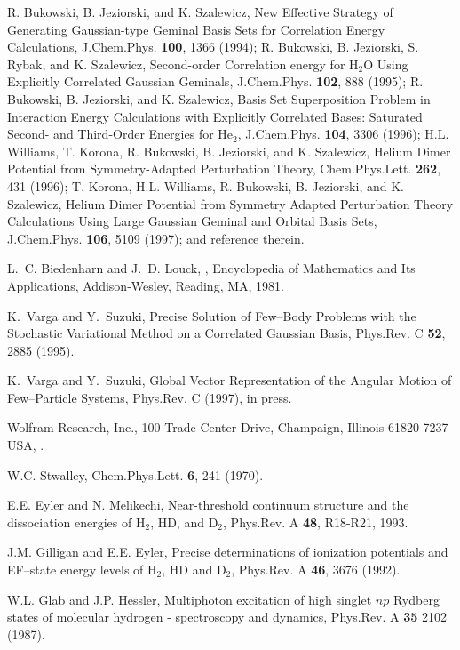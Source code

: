 \begin{thebibliography}{999}
R. Bukowski, B. Jeziorski, and K. Szalewicz,
New Effective Strategy of Generating Gaussian-type Geminal
Basis Sets for Correlation Energy Calculations,
J.Chem.Phys. {\bf 100}, 1366 (1994);
R. Bukowski, B. Jeziorski, S. Rybak, and K. Szalewicz,
Second-order Correlation energy for H$_2$O Using
Explicitly Correlated Gaussian Geminals,
J.Chem.Phys. {\bf 102}, 888 (1995);
R. Bukowski, B. Jeziorski, and K. Szalewicz,
Basis Set Superposition Problem in Interaction Energy
Calculations with Explicitly Correlated Bases:
Saturated Second- and Third-Order Energies for He$_2$,
J.Chem.Phys. {\bf 104}, 3306 (1996);
H.L. Williams, T. Korona, R. Bukowski, B. Jeziorski, and K. Szalewicz,
Helium Dimer Potential from Symmetry-Adapted
Perturbation Theory,
Chem.Phys.Lett. {\bf 262}, 431 (1996);
T. Korona, H.L. Williams, R. Bukowski,
B. Jeziorski, and K. Szalewicz,
Helium Dimer Potential from Symmetry Adapted Perturbation Theory
Calculations Using Large Gaussian Geminal and Orbital Basis Sets,
J.Chem.Phys. {\bf 106}, 5109 (1997);
and reference therein.


L.~C. Biedenharn and J.~D. Louck,
,
\newblock Encyclopedia of Mathematics and Its Applications, Addison-{W}esley,
Reading, {MA}, 1981.

K.~Varga and Y.~Suzuki,
Precise Solution of Few--Body Problems with the
Stochastic Variational Method on a Correlated Gaussian Basis,
\newblock Phys.Rev. C {\bf 52}, 2885 (1995).


K.~Varga and Y.~Suzuki,
Global Vector Representation of the Angular Motion of
Few--Particle Systems,
\newblock Phys.Rev. C  (1997),
\newblock in press.


Wolfram Research, Inc., 
100 Trade Center Drive, Champaign, Illinois 61820-7237
USA,
.


W.C. Stwalley, Chem.Phys.Lett. {\bf 6}, 241 (1970).

E.E. Eyler and N. Melikechi, Near-threshold continuum structure
and the dissociation energies of H$_2$, HD, and D$_2$,
Phys.Rev. A {\bf 48}, R18-R21, 1993.

J.M. Gilligan and E.E. Eyler,
Precise determinations of ionization potentials and EF--state
energy levels of H$_2$, HD and D$_2$,
Phys.Rev. A {\bf 46}, 3676 (1992).

W.L. Glab and J.P. Hessler,
Multiphoton excitation of high singlet $np$ Rydberg states of
molecular hydrogen - spectroscopy and dynamics,
Phys.Rev. A {\bf 35} 2102 (1987).


\end{thebibliography}
